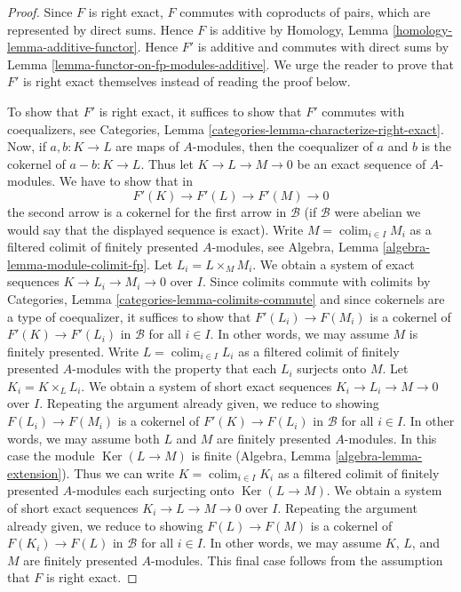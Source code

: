 \documentclass{stacks-project}
\theoremstyle{plain}
\theoremstyle{definition}
\theoremstyle{remark}
\numberwithin{equation}{subsection}
\def\colim{\mathop{\mathrm{colim}}\nolimits}
\def\Ker{\mathop{\mathrm{Ker}}}
\begin{document}
\begin{proof}
Since $F$ is right exact, $F$ commutes with coproducts of pairs, which are
represented by direct sums. Hence $F$ is additive by
Homology, Lemma \ref{homology-lemma-additive-functor}.
Hence $F'$ is additive and commutes with direct sums by
Lemma \ref{lemma-functor-on-fp-modules-additive}.
We urge the reader to prove that $F'$ is right exact themselves
instead of reading the proof below.

\medskip\noindent
To show that $F'$ is right exact, it suffices to show that $F'$ commutes
with coequalizers, see
Categories, Lemma \ref{categories-lemma-characterize-right-exact}.
Now, if $a, b : K \to L$ are maps of $A$-modules, then the
coequalizer of $a$ and $b$ is the cokernel of $a - b : K \to L$.
Thus let $K \to L \to M \to 0$ be an exact sequence
of $A$-modules. We have to show that in
$$
F'(K) \to F'(L) \to F'(M) \to 0
$$
the second arrow is a cokernel for the first arrow in $\mathcal{B}$
(if $\mathcal{B}$ were abelian we would say that the displayed sequence
is exact).
Write $M = \colim_{i \in I} M_i$ as a filtered colimit of finitely
presented $A$-modules, see
Algebra, Lemma \ref{algebra-lemma-module-colimit-fp}.
Let $L_i = L \times_M M_i$. 
We obtain a system of exact sequences $K \to L_i \to M_i \to 0$ over $I$.
Since colimits commute with colimits by
Categories, Lemma \ref{categories-lemma-colimits-commute}
and since cokernels are a type of coequalizer,
it suffices to show that $F'(L_i) \to F(M_i)$ is a cokernel of
$F'(K) \to F'(L_i)$ in $\mathcal{B}$ for all $i \in I$. In other words, we may
assume $M$ is finitely presented. Write $L = \colim_{i \in I} L_i$
as a filtered colimit of finitely presented $A$-modules
with the property that each $L_i$ surjects onto $M$.
Let $K_i = K \times_L L_i$. We obtain a system of short exact sequences
$K_i \to L_i \to M \to 0$ over $I$.
Repeating the argument already given, we reduce to showing
$F(L_i) \to F(M_i)$ is a cokernel of
$F'(K) \to F(L_i)$ in $\mathcal{B}$ for all $i \in I$.
In other words, we may assume both
$L$ and $M$ are finitely presented $A$-modules.
In this case the module $\Ker(L \to M)$ is finite
(Algebra, Lemma \ref{algebra-lemma-extension}).
Thus we can write $K = \colim_{i \in I} K_i$ as a filtered colimit
of finitely presented $A$-modules each surjecting onto $\Ker(L \to M)$.
We obtain a system of short exact sequences
$K_i \to L \to M \to 0$ over $I$.
Repeating the argument already given, we reduce to showing
$F(L) \to F(M)$ is a cokernel of
$F(K_i) \to F(L)$ in $\mathcal{B}$ for all $i \in I$.
In other words, we may assume $K$, $L$, and $M$
are finitely presented $A$-modules. This final case follows
from the assumption that $F$ is right exact.
\end{proof}
\end{document}
